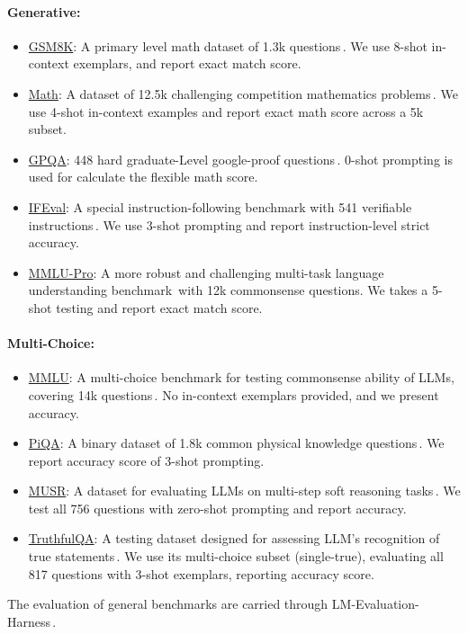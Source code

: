 \paragraph{Generative:}
\begin{itemize}
[leftmargin=*,noitemsep,topsep=0pt]
\item \underline{GSM8K}: A primary level math dataset of 1.3k questions\,\cite{cobbe2021training}. We use 8-shot in-context exemplars, and report exact match score.
\item \underline{Math}: A dataset of 12.5k challenging competition mathematics problems\,\cite{hendrycksmath2021}. We use 4-shot in-context examples and report exact math score across a 5k subset.
\item \underline{GPQA}: 448 hard graduate-Level google-proof questions\,\cite{rein2023gpqa}. 0-shot prompting is used for calculate the flexible math score.
\item \underline{IFEval}: A special instruction-following benchmark with 541 verifiable instructions\,\cite{zhou2023instructionfollowing}. We use 3-shot prompting and report instruction-level strict accuracy.
\item \underline{MMLU-Pro}: A more robust and challenging multi-task language understanding benchmark\,\cite{wang2024mmluprorobustchallengingmultitask} with 12k commonsense questions. We takes a 5-shot testing and report exact match score.
\end{itemize}

\vspace{-2mm}
\paragraph{Multi-Choice:}
\begin{itemize}
[leftmargin=*,noitemsep,topsep=0pt]
\item \underline{MMLU}: A multi-choice benchmark for testing commonsense ability of LLMs, covering 14k questions\,\cite{hendrycks2020measuring}. No in-context exemplars provided, and we present accuracy.
\item \underline{PiQA}: A binary dataset of 1.8k common physical knowledge questions\,\cite{bisk2020piqa}. We report accuracy score of 3-shot prompting.
\item \underline{MUSR}: A dataset for evaluating LLMs on multi-step soft reasoning tasks\,\cite{sprague2024musrtestinglimitschainofthought}. We test all 756 questions with zero-shot prompting and report accuracy.
\item \underline{TruthfulQA}: A testing dataset designed for assessing LLM's recognition of true statements\,\cite{lin-etal-2022-truthfulqa}. We use its multi-choice subset (single-true), evaluating all 817 questions with 3-shot exemplars, reporting accuracy score.
\end{itemize}
The evaluation of general benchmarks are carried through LM-Evaluation-Harness\,\cite{eval-harness}.

